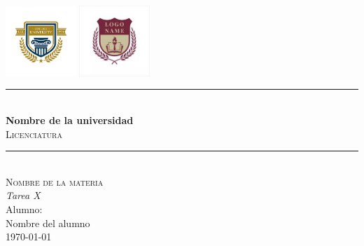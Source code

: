 \documentclass[11pt]{article}
\begin{document}
	
	\begin{titlepage}
		
		\centering
		\includegraphics[width=0.2\textwidth]{logo_universidad} %
		\hspace*{0.4\textwidth}
		\includegraphics[width=0.2\textwidth]{images}\par\vspace{0.3cm} %
		{\color{black}\rule{\textwidth}{4pt}}\\
		\vspace{1cm}
		{\bfseries\LARGE Nombre de la universidad}\\
		\vspace{1cm}
		{\scshape\Large Licenciatura}\\
		\vspace{1cm}
		{\color{black}\rule{\textwidth}{4pt}}\\
		\vspace{3cm}
		{\scshape\Huge Nombre de la materia}\\
		\vspace{3cm}
		{\itshape\Huge Tarea X}\\
		\vfill
		{\Large Alumno: }\\
		{\Large Nombre del alumno}\\
		\vfill
		{\Large \today}\\ %
		
	\end{titlepage}
\end{document}
